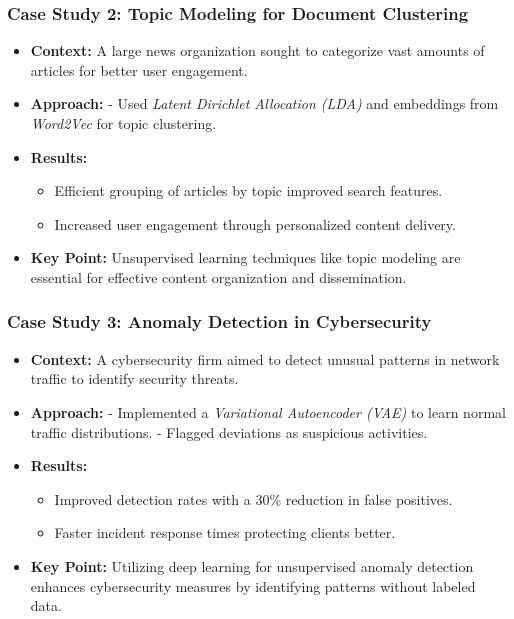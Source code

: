 \documentclass[aspectratio=169]{beamer}
\begin{document}
\begin{frame}[fragile]
  \frametitle{Case Study 2: Topic Modeling for Document Clustering}
  \begin{itemize}
    \item \textbf{Context:} 
      A large news organization sought to categorize vast amounts of articles for better user engagement.
    \item \textbf{Approach:} 
      - Used \textit{Latent Dirichlet Allocation (LDA)} and embeddings from \textit{Word2Vec} for topic clustering.
    \item \textbf{Results:} 
      \begin{itemize}
        \item Efficient grouping of articles by topic improved search features.
        \item Increased user engagement through personalized content delivery.
      \end{itemize}
    \item \textbf{Key Point:} 
      Unsupervised learning techniques like topic modeling are essential for effective content organization and dissemination.
  \end{itemize}
\end{frame}

\begin{frame}[fragile]
  \frametitle{Case Study 3: Anomaly Detection in Cybersecurity}
  \begin{itemize}
    \item \textbf{Context:} 
      A cybersecurity firm aimed to detect unusual patterns in network traffic to identify security threats.
    \item \textbf{Approach:} 
      - Implemented a \textit{Variational Autoencoder (VAE)} to learn normal traffic distributions.
      - Flagged deviations as suspicious activities.
    \item \textbf{Results:} 
      \begin{itemize}
        \item Improved detection rates with a 30\% reduction in false positives.
        \item Faster incident response times protecting clients better.
      \end{itemize}
    \item \textbf{Key Point:} 
      Utilizing deep learning for unsupervised anomaly detection enhances cybersecurity measures by identifying patterns without labeled data.
  \end{itemize}
\end{frame}
\end{document}
